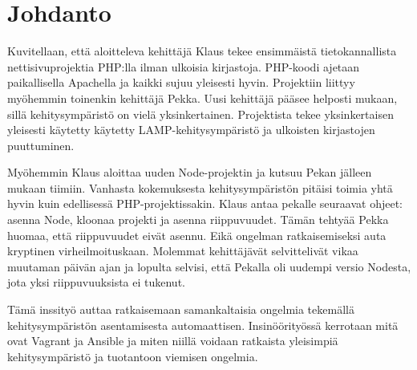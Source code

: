 \chapter{Johdanto}

Kuvitellaan, että aloitteleva kehittäjä Klaus tekee ensimmäistä tietokannallista nettisivuprojektia PHP:lla ilman ulkoisia kirjastoja. PHP-koodi ajetaan paikallisella Apachella ja kaikki sujuu yleisesti hyvin. Projektiin liittyy myöhemmin toinenkin kehittäjä Pekka. Uusi kehittäjä pääsee helposti mukaan, sillä kehitysympäristö on vielä yksinkertainen. Projektista tekee yksinkertaisen yleisesti käytetty käytetty LAMP-kehitysympäristö ja ulkoisten kirjastojen puuttuminen.

Myöhemmin Klaus aloittaa uuden Node-projektin ja kutsuu Pekan jälleen mukaan tiimiin. Vanhasta kokemuksesta kehitysympäristön pitäisi toimia yhtä hyvin kuin edellisessä PHP-projektissakin. Klaus antaa pekalle seuraavat ohjeet: asenna Node, kloonaa projekti ja asenna riippuvuudet. Tämän tehtyää Pekka huomaa, että riippuvuudet eivät asennu. Eikä ongelman ratkaisemiseksi auta kryptinen virheilmoituskaan. Molemmat kehittäjävät selvittelivät vikaa muutaman päivän ajan ja lopulta selvisi, että Pekalla oli uudempi versio Nodesta, jota yksi riippuvuuksista ei tukenut.

Tämä inssityö auttaa ratkaisemaan samankaltaisia ongelmia tekemällä  kehitysympäristön asentamisesta automaattisen. Insinöörityössä kerrotaan mitä ovat Vagrant ja Ansible ja miten niillä voidaan ratkaista yleisimpiä kehitysympäristö ja tuotantoon viemisen ongelmia.
